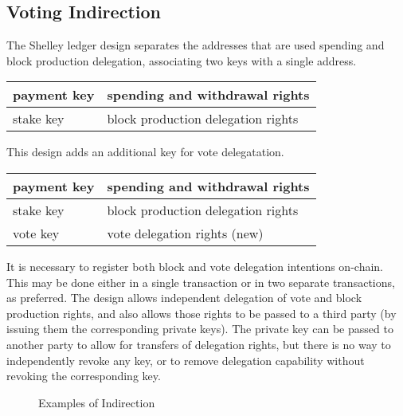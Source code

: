 \subsection{Voting Indirection}

The Shelley ledger design separates the addresses that are used spending and block production delegation, associating two keys with a single address.

\begin{center}
  \begin{tabular}{||l|l||}
\hline\hline
  payment key & spending and withdrawal rights \\\hline
  stake key & block production delegation rights \\\hline
  \hline\hline
  \end{tabular}
\end{center}

This design adds an additional key for vote delegatation.

\begin{center}
  \begin{tabular}{||l|l||}
\hline\hline
  payment key & spending and withdrawal rights \\\hline
  stake key & block production delegation rights \\\hline
  vote key & vote delegation rights (new) \\
\hline\hline
\end{tabular}
\end{center}

It is necessary to register both block and vote delegation intentions on-chain.  This may be done either in a single transaction or in two separate transactions,
as preferred.  The design allows independent delegation of vote and block production rights,
and also allows those rights to be passed to a third party (by issuing them the corresponding private keys).  
The private key can be passed to another party to allow for transfers of delegation rights, but there is no way to independently revoke any key, or to remove
delegation capability without revoking the corresponding key.  

\begin{figure*}[h]
  \caption{Examples of Indirection}
\end{figure*}
